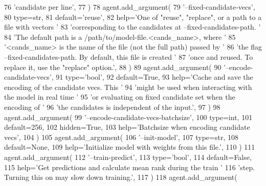 \begin{DoxyCode}
76             \textcolor{stringliteral}{'candidate per line'},
77         )
78         agent.add\_argument(
79             \textcolor{stringliteral}{'--fixed-candidate-vecs'},
80             type=str,
81             default=\textcolor{stringliteral}{'reuse'},
82             help=\textcolor{stringliteral}{'One of "reuse", "replace", or a path to a file with vectors '}
83             \textcolor{stringliteral}{'corresponding to the candidates at --fixed-candidates-path. '}
84             \textcolor{stringliteral}{'The default path is a /path/to/model-file.<cands\_name>, where '}
85             \textcolor{stringliteral}{'<cands\_name> is the name of the file (not the full path) passed by '}
86             \textcolor{stringliteral}{'the flag --fixed-candidates-path. By default, this file is created '}
87             \textcolor{stringliteral}{'once and reused. To replace it, use the "replace" option.'},
88         )
89         agent.add\_argument(
90             \textcolor{stringliteral}{'--encode-candidate-vecs'},
91             type=\textcolor{stringliteral}{'bool'},
92             default=\textcolor{keyword}{True},
93             help=\textcolor{stringliteral}{'Cache and save the encoding of the candidate vecs. This '}
94             \textcolor{stringliteral}{'might be used when interacting with the model in real time '}
95             \textcolor{stringliteral}{'or evaluating on fixed candidate set when the encoding of '}
96             \textcolor{stringliteral}{'the candidates is independent of the input.'},
97         )
98         agent.add\_argument(
99             \textcolor{stringliteral}{'--encode-candidate-vecs-batchsize'},
100             type=int,
101             default=256,
102             hidden=\textcolor{keyword}{True},
103             help=\textcolor{stringliteral}{'Batchsize when encoding candidate vecs'},
104         )
105         agent.add\_argument(
106             \textcolor{stringliteral}{'--init-model'},
107             type=str,
108             default=\textcolor{keywordtype}{None},
109             help=\textcolor{stringliteral}{'Initialize model with weights from this file.'},
110         )
111         agent.add\_argument(
112             \textcolor{stringliteral}{'--train-predict'},
113             type=\textcolor{stringliteral}{'bool'},
114             default=\textcolor{keyword}{False},
115             help=\textcolor{stringliteral}{'Get predictions and calculate mean rank during the train '}
116             \textcolor{stringliteral}{'step. Turning this on may slow down training.'},
117         )
118         agent.add\_argument(

\end{DoxyCode}
